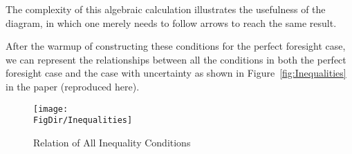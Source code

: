 \documentclass[\econtexRoot/BufferStockTheory]{subfiles}
\begin{document}
The complexity of this algebraic calculation illustrates the usefulness of the diagram, in which one merely needs to follow arrows to reach the same result.

After the warmup of constructing these conditions for the perfect foresight case, we can represent the relationships between all the conditions in both the perfect foresight case and the case with uncertainty as shown in Figure~\ref{fig:Inequalities} in the paper (reproduced here).

\begin{figure}[h]
  \centerline{
    \texttt{[image: \\FigDir/Inequalities]}
  }
  \caption{Relation of All Inequality Conditions} \label{fig:InequalitiesApp}
\end{figure}

\onlyinsubfile{}
\end{document}
